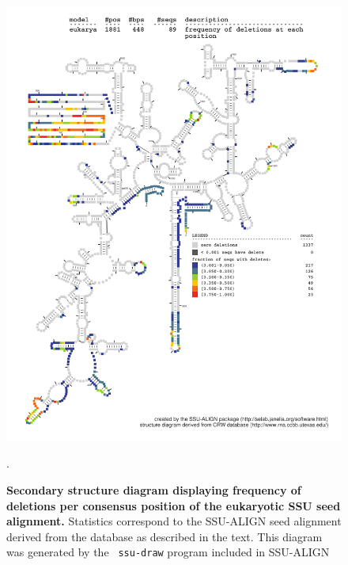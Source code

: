 \begin{figure}
\begin{center}
\includegraphics[width=5.64in]{Figures/eukarya-0p1-dall}
\end{center}
\caption[Secondary structure diagram displaying frequency of deletions
  per consensus position of the eukaryotic SSU seed
  alignment]{\textbf{Secondary structure diagram displaying frequency 
  of deletions per consensus position of the eukaryotic SSU seed
  alignment.} Statistics correspond to the SSU-ALIGN seed
  alignment derived from the  database \cite{CannoneGutell02}
  as described in the text. This diagram was generated by the {\tt
  ssu-draw} program included in SSU-ALIGN}.
\label{fig:eukdel}
\end{figure}

\newpage 

